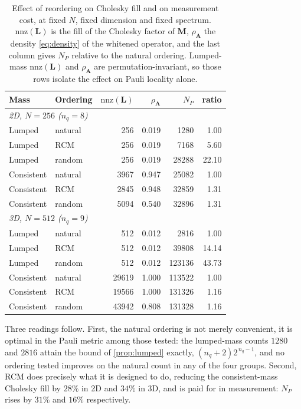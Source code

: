 \documentclass{ieeeaccess}
\newcommand{\M}{\mathbf{M}}
\newcommand{\A}{\mathbf{A}}
\begin{document}
\begin{table}[t]
\centering
\caption{Effect of reordering on Cholesky fill and on measurement cost, at fixed $N$, fixed
dimension and fixed spectrum. $\mathrm{nnz}(\mathbf L)$ is the fill of the Cholesky factor of
$\M$, $\rho_\A$ the density \eqref{eq:density} of the whitened operator, and the last column
gives $N_P$ relative to the natural ordering. Lumped-mass $\mathrm{nnz}(\mathbf L)$ and
$\rho_\A$ are permutation-invariant, so those rows isolate the effect on Pauli locality alone.}
\label{tab:ordering}
\small
\setlength{\tabcolsep}{4pt}
\begin{tabular}{llrrrr}
\toprule
Mass & Ordering & $\mathrm{nnz}(\mathbf L)$ & $\rho_\A$ & $N_P$ & ratio\\
\midrule
\multicolumn{6}{l}{\emph{2D, $N=256$ ($n_q=8$)}}\\
Lumped     & natural & 256   & 0.019 & 1280   & 1.00\\
Lumped     & RCM     & 256   & 0.019 & 7168   & 5.60\\
Lumped     & random  & 256   & 0.019 & 28288  & 22.10\\
Consistent & natural & 3967  & 0.947 & 25082  & 1.00\\
Consistent & RCM     & 2845  & 0.948 & 32859  & 1.31\\
Consistent & random  & 5094  & 0.540 & 32896  & 1.31\\
\midrule
\multicolumn{6}{l}{\emph{3D, $N=512$ ($n_q=9$)}}\\
Lumped     & natural & 512   & 0.012 & 2816   & 1.00\\
Lumped     & RCM     & 512   & 0.012 & 39808  & 14.14\\
Lumped     & random  & 512   & 0.012 & 123136 & 43.73\\
Consistent & natural & 29619 & 1.000 & 113522 & 1.00\\
Consistent & RCM     & 19566 & 1.000 & 131326 & 1.16\\
Consistent & random  & 43942 & 0.808 & 131328 & 1.16\\
\bottomrule
\end{tabular}
\end{table}

Three readings follow. First, the natural ordering is not merely convenient, it is optimal in
the Pauli metric among those tested: the lumped-mass counts $1280$ and $2816$ attain the bound
of \cref{prop:lumped} exactly, $(n_q+2)2^{\,n_q-1}$, and no ordering tested improves on the
natural count in any of the four groups. Second, RCM does precisely what it is designed to do,
reducing the consistent-mass Cholesky fill by $28\%$ in 2D and $34\%$ in 3D, and is paid for in
measurement: $N_P$ rises by $31\%$ and $16\%$ respectively.
\end{document}
